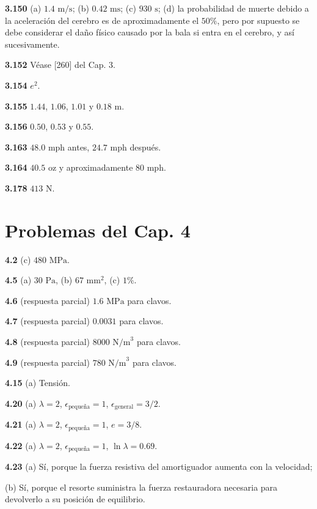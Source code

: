 \documentclass[12pt,a4paper]{book}
\begin{document}
\noindent \textbf{3.150} (a) $1.4\text{ m/s}$; (b) $0.42\text{ ms}$; (c) $930\text{ s}$; (d) la probabilidad de muerte debido a la aceleración del cerebro es de aproximadamente el $50\%$, pero por supuesto se debe considerar el daño físico causado por la bala si entra en el cerebro, y así sucesivamente.

\noindent \textbf{3.152} Véase [260] del Cap. 3.

\noindent \textbf{3.154} $e^2$.

\noindent \textbf{3.155} $1.44$, $1.06$, $1.01$ y $0.18\text{ m}$.

\noindent \textbf{3.156} $0.50$, $0.53$ y $0.55$.

\noindent \textbf{3.163} $48.0\text{ mph}$ antes, $24.7\text{ mph}$ después.

\noindent \textbf{3.164} $40.5\text{ oz}$ y aproximadamente $80\text{ mph}$.

\noindent \textbf{3.178} $413\text{ N}$.

\section*{Problemas del Cap. 4}

\noindent \textbf{4.2} (c) $480\text{ MPa}$.

\noindent \textbf{4.5} (a) $30\text{ Pa}$, (b) $67\text{ mm}^2$, (c) $1\%$.

\noindent \textbf{4.6} (respuesta parcial) $1.6\text{ MPa}$ para clavos.

\noindent \textbf{4.7} (respuesta parcial) $0.0031$ para clavos.

\noindent \textbf{4.8} (respuesta parcial) $8000\text{ N/m}^3$ para clavos.

\noindent \textbf{4.9} (respuesta parcial) $780\text{ N/m}^3$ para clavos.

\noindent \textbf{4.15} (a) Tensión.

\noindent \textbf{4.20} (a) $\lambda = 2$, $\epsilon_{\text{pequeña}} = 1$, $\epsilon_{\text{general}} = 3/2$.

\noindent \textbf{4.21} (a) $\lambda = 2$, $\epsilon_{\text{pequeña}} = 1$, $e = 3/8$.

\noindent \textbf{4.22} (a) $\lambda = 2$, $\epsilon_{\text{pequeña}} = 1$, $\ln\lambda = 0.69$.

\noindent \textbf{4.23} (a) Sí, porque la fuerza resistiva del amortiguador aumenta con la velocidad;

(b) Sí, porque el resorte suministra la fuerza restauradora necesaria para devolverlo a su posición de equilibrio.
\end{document}
